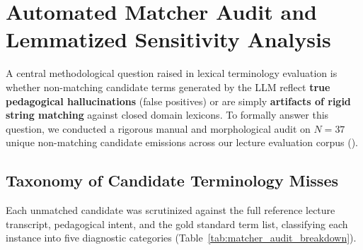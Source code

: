 \documentclass[a4paper,12pt]{report}
\begin{document}
\section{Automated Matcher Audit and Lemmatized Sensitivity Analysis}
\label{sec:matcher_audit}
A central methodological question raised in lexical terminology evaluation is whether non-matching candidate terms generated by the LLM reflect \textbf{true pedagogical hallucinations} (false positives) or are simply \textbf{artifacts of rigid string matching} against closed domain lexicons. To formally answer this question, we conducted a rigorous manual and morphological audit on $N = 37$ unique non-matching candidate emissions across our lecture evaluation corpus ().

\subsection{Taxonomy of Candidate Terminology Misses}
Each unmatched candidate was scrutinized against the full reference lecture transcript, pedagogical intent, and the gold standard term list, classifying each instance into five diagnostic categories (Table~\ref{tab:matcher_audit_breakdown}).
\end{document}
